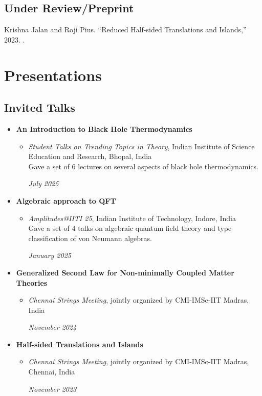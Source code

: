 \documentclass[11pt, letterpaper]{article}
\let\oldhref\href
\renewcommand{\href}[3][blue]{\oldhref{#2}{\color{#1}{#3}}}
\newcommand{\entry}[4]{
	\ifthenelse{\isempty{#3}}
	{\slimentry{#1}{#2}}{
		\begin{minipage}[t]{.25\linewidth}
			\hfill #1
		\end{minipage}
		\hfill \vline \hfill
		\begin{minipage}[t]{.7\linewidth}
			{\bf #2} \\ #3 \\ \footnotesize{#4}
		\end{minipage}\\
		\vspace{.2cm}
}}
\newcommand{\slimentry}[2]{
	\begin{minipage}[t]{.25\linewidth}
		\hfill \textsc{#1}
	\end{minipage}
	\hfill \vline \hfill
	\begin{minipage}[t]{.7\linewidth}
		#2
	\end{minipage}\\
	\vspace{.25cm}
}%
\newcommand{\colentry}[2]{
	\begin{minipage}[t]{.75\linewidth}
		#1
	\end{minipage}
	\hfill
	\begin{minipage}[t]{.22\linewidth}
		\hfill #2
	\end{minipage}
}%
\begin{document}
	\subsection{Under Review/Preprint}
	\begin{etaremune}
		\item Krishna Jalan and Roji Pius. ``Reduced Half-sided Translations and Islands,'' 2023. \href{https://arxiv.org/abs/2312.11085}{[2312.11085]}.
	\end{etaremune}
	
	\section{Presentations}
	\subsection{Invited Talks}
	\begin{itemize}[itemsep=10pt]
		\item \textbf{An Introduction to Black Hole Thermodynamics}
		\begin{itemize}[nolistsep]
			\item \colentry{\emph{Student Talks on Trending Topics in Theory}, Indian Institute of Science Education and Research, Bhopal, India \\ Gave a set of 6 lectures on several aspects of black hole thermodynamics.}{\textit{July 2025}}
		\end{itemize}
		\item \textbf{Algebraic approach to QFT}
		\begin{itemize}[nolistsep]
			\item \colentry{\emph{Amplitudes@IITI 25}, Indian Institute of Technology, Indore, India \\ \hspace{10pt} Gave a set of 4 talks on algebraic quantum field theory and type classification of von Neumann algebras.}{\textit{January 2025}}
		\end{itemize}
		\item \textbf{Generalized Second Law for Non-minimally Coupled Matter Theories}
		\begin{itemize}[nolistsep]
			\item \colentry{\emph{Chennai Strings Meeting}, jointly organized by CMI-IMSc-IIT Madras, India}{\textit{November 2024}}
		\end{itemize}
		\item \textbf{Half-sided Translations and Islands}
		\begin{itemize}[nolistsep]
			\item \colentry{\emph{Chennai Strings Meeting}, jointly organized by CMI-IMSc-IIT Madras, Chennai, India}{\textit{November 2023}}
		\end{itemize}
	\end{itemize}
	
\end{document}

